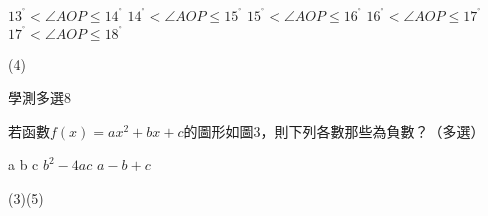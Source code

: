 \begin{QUESTIONS}
\begin{QUESTION}
\begin{QBODY}
            \begin{QOPS}
                \QOP ${{13}^{{}^\circ }}<\angle AOP\le {{14}^{{}^\circ }}$	
                \QOP ${{14}^{{}^\circ }}<\angle AOP\le {{15}^{{}^\circ }}$
                \QOP ${{15}^{{}^\circ }}<\angle AOP\le {{16}^{{}^\circ }}$	
                \QOP ${{16}^{{}^\circ }}<\angle AOP\le {{17}^{{}^\circ }}$
                \QOP ${{17}^{{}^\circ }}<\angle AOP\le {{18}^{{}^\circ }}$
            \end{QOPS}        
        \end{QBODY}
        \begin{QFROMS}
        \end{QFROMS}
        \begin{QTAGS}\end{QTAGS}
        \begin{QANS}
            (4)
        \end{QANS}
        \begin{QSOLLIST}
        \end{QSOLLIST}
        \begin{QEMPTYSPACE}
        \end{QEMPTYSPACE}
    \end{QUESTION}
\end{QUESTIONS}\begin{QUESTIONS}
    \begin{QUESTION}
        \begin{ExamInfo}{83}{學測}{多選}{8}
        \end{ExamInfo}
        \begin{ExamAnsRateInfo}{}{}{}{}
        \end{ExamAnsRateInfo}
        \begin{QBODY}
            若函數$f\left( x \right)=a{{x}^{2}}+bx+c$的圖形如圖3，則下列各數那些為負數？（多選）
            \begin{QOPS}
            \QOP a
            \QOP b
            \QOP c
            \QOP ${{b}^{2}}-4ac$ 
            \QOP $a-b+c$
            \end{QOPS}        
        \end{QBODY}
        \begin{QFROMS}
        \end{QFROMS}
        \begin{QTAGS}\end{QTAGS}
        \begin{QANS}
            (3)(5)
        \end{QANS}

\end{QUESTION}
\end{QUESTIONS}
